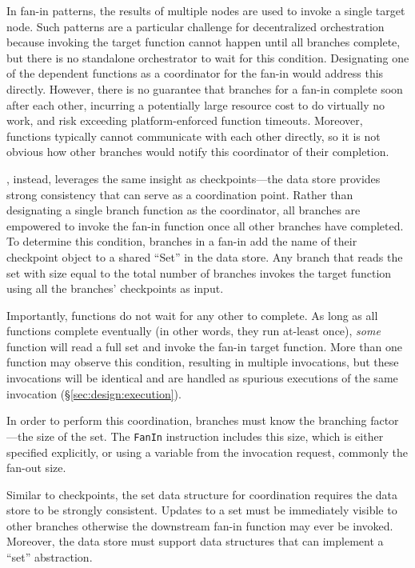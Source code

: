 In fan-in patterns, the results of multiple nodes are used to invoke a single
target node. Such patterns are a particular challenge for decentralized
orchestration because invoking the target function cannot happen until all
branches complete, but there is no standalone orchestrator to wait for this
condition. Designating one of the dependent functions as a coordinator for
the fan-in would address this directly. However, there is no guarantee that
branches for a fan-in complete soon after each other, incurring a potentially
large resource cost to do virtually no work, and risk exceeding
platform-enforced function timeouts. Moreover, functions typically cannot
communicate with each other directly, so it is not obvious how other branches
would notify this coordinator of their completion.

\name{}, instead, leverages the same insight as checkpoints---the data store
provides strong consistency that can serve as a coordination point. Rather
than designating a single branch function as the coordinator, all branches are
empowered to invoke the fan-in function once all other branches have
completed. To determine this condition, branches in a fan-in add the name of
their checkpoint object to a shared ``Set'' in the data store. Any branch that
reads the set with size equal to the total number of branches invokes the
target function using all the branches' checkpoints as input.

Importantly, functions do not wait for any other to complete. As long as all
functions complete eventually (in other words, they run at-least once),
\emph{some} function will read a full set and invoke the fan-in target
function. More than one function may observe this condition, resulting in
multiple invocations, but these invocations will be identical and are handled
as spurious executions of the same invocation (\S\ref{sec:design:execution}).

In order to perform this coordination, branches must know the branching
factor---the size of the set. The \texttt{FanIn} instruction includes this
size, which is either specified explicitly, or using a variable from the
invocation request, commonly the fan-out size.

Similar to checkpoints, the set data structure for coordination requires the
data store to be strongly consistent. Updates to a set must be immediately
visible to other branches otherwise the downstream fan-in function may ever be
invoked. Moreover, the data store must support data structures that can
implement a ``set'' abstraction.

